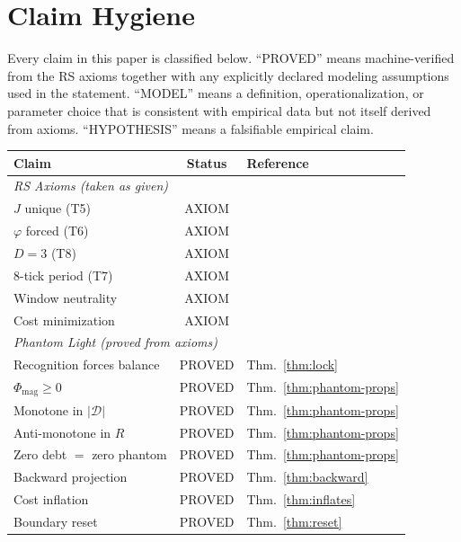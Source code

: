 \documentclass[11pt, a4paper]{article}
\theoremstyle{definition}
\theoremstyle{remark}
\begin{document}
\section{Claim Hygiene}\label{sec:hygiene}

Every claim in this paper is classified below. ``PROVED'' means
machine-verified from the RS axioms together with any explicitly
declared modeling assumptions used in the statement. ``MODEL'' means
a definition, operationalization, or parameter choice that is
consistent with empirical data but not itself derived from axioms.
``HYPOTHESIS''
means a falsifiable empirical claim.

\begin{center}
\small
\begin{longtable}{p{4.2cm}cp{3.8cm}}
\toprule
\textbf{Claim} & \textbf{Status} & \textbf{Reference} \\
\midrule
\endhead
\multicolumn{3}{l}{\textit{RS Axioms (taken as given)}} \\
$J$ unique (T5) & AXIOM & \cite{RSCost2025} \\
$\varphi$ forced (T6) & AXIOM & \cite{RSAxioms2025} \\
$D=3$ (T8) & AXIOM & \cite{RSGeometry2025} \\
8-tick period (T7) & AXIOM & \cite{RSAxioms2025} \\
Window neutrality & AXIOM & \cite{RSAxioms2025} \\
Cost minimization & AXIOM & \cite{RSAxioms2025} \\
\midrule
\multicolumn{3}{l}{\textit{Phantom Light (proved from axioms)}} \\
Recognition forces balance & PROVED & Thm.~\ref{thm:lock} \\
$\Phi_{\mathrm{mag}} \geq 0$ & PROVED & Thm.~\ref{thm:phantom-props} \\
Monotone in $|\mathcal{D}|$ & PROVED & Thm.~\ref{thm:phantom-props} \\
Anti-monotone in $R$ & PROVED & Thm.~\ref{thm:phantom-props} \\
Zero debt $=$ zero phantom & PROVED & Thm.~\ref{thm:phantom-props} \\
Backward projection & PROVED & Thm.~\ref{thm:backward} \\
Cost inflation & PROVED & Thm.~\ref{thm:inflates} \\
Boundary reset & PROVED & Thm.~\ref{thm:reset} \\

\end{longtable}
\end{center}
\end{document}
